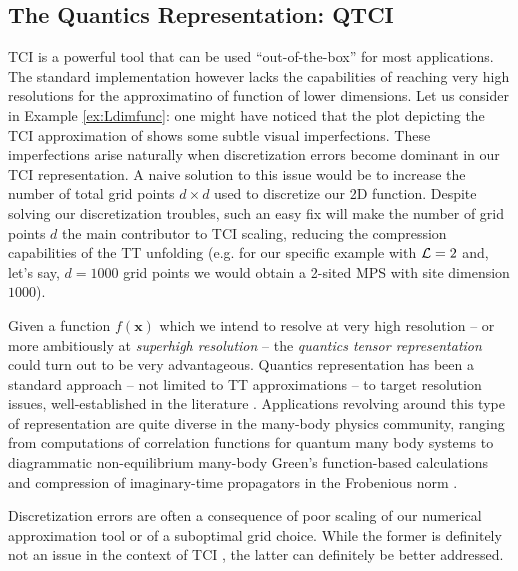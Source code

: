 \subsection{The Quantics Representation: QTCI}
TCI is a powerful tool that can be used ``out-of-the-box'' for most applications. The standard implementation however lacks the capabilities of reaching very high resolutions for the approximatino of function of lower dimensions. Let us consider  in Example \ref{ex:Ldimfunc}: one might have noticed that the plot depicting the TCI approximation of  shows some subtle visual imperfections. These imperfections arise naturally when discretization errors become dominant in our TCI representation. A naive solution to this issue would be to increase the number of total grid points $d\times d$ used to discretize our 2D function. Despite solving our discretization troubles, such an easy fix will make the number of grid points $d$ the main contributor to TCI scaling, reducing the compression capabilities of the TT unfolding (e.g. for our specific example with $\mathcal{L} = 2$ and, let's say, $d=1000$ grid points we would obtain a 2-sited MPS with site dimension $1000$). 

Given a function $f(\boldsymbol{x})$ which we intend to resolve at very high resolution -- or more ambitiously at \textit{superhigh resolution} -- the \textit{quantics tensor representation} could turn out to be very advantageous. Quantics representation has been a standard approach -- not limited to TT approximations -- to target resolution issues, well-established in the literature \cite{Oseledets2009, Khoromskij2011, Hiroshi2023, Takahashi2025, Murray2024, Ritter2024}. Applications revolving around this type of representation are quite diverse in the many-body physics community, ranging from computations of correlation functions for quantum many body systems \cite{Hiroshi2023} to diagrammatic non-equilibrium many-body Green’s function-based calculations \cite{Murray2024} and compression of imaginary-time propagators in the Frobenious norm \cite{Takahashi2025}.

Discretization errors are often a consequence of poor scaling of our numerical approximation tool or of a suboptimal grid choice. While the former is definitely not an issue in the context of TCI \cite{Fernandez2024}, the latter can definitely be better addressed.

